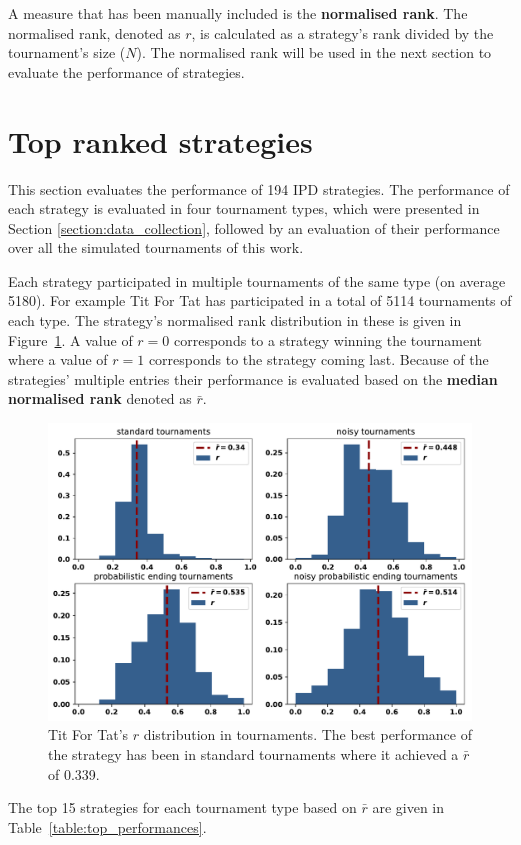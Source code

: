 \documentclass{article}
\newcommand{\numberofalltournaments}{}
\begin{document}
A measure that has been manually included
is the \textbf{normalised rank}. The normalised rank, denoted as $r$, is
calculated as a strategy's rank divided by the tournament's size ($N$). The
normalised rank will be used in the next section to evaluate the performance of
strategies.

\section{Top ranked strategies}\label{section:top_performances}

This section evaluates the performance of 194 IPD strategies. The performance of
each strategy is evaluated in four tournament types, which were presented in Section
\ref{section:data_collection}, followed by an evaluation of their performance
over all the \numberofalltournaments simulated tournaments of this work.

Each strategy participated in multiple tournaments of the same type (on average 5180).
For example Tit For Tat has participated in a total of 5114
tournaments of each type. The strategy's normalised rank distribution in these
is given in Figure~\ref{fig:tit_for_tat_r_distribution}. A value of \(r =
0\) corresponds to a strategy winning the tournament where a value of
\(r = 1\) corresponds to the strategy coming last. Because of the strategies'
multiple entries their performance is evaluated based on the
\textbf{median normalised rank} denoted as \(\bar{r}\).

\begin{figure}[!htbp]
    \centering
    \includegraphics[width=.45\textwidth]{../images/tit_for_tat_r_distributions.pdf}
    \caption{Tit For Tat's $r$ distribution in tournaments. The best performance
    of the strategy has been in standard tournaments where it achieved a $\bar{r}$
    of 0.339.}
    \label{fig:tit_for_tat_r_distribution}
\end{figure}

The top 15 strategies for each tournament type based on \(\bar{r}\) are given in
Table~\ref{table:top_performances}.
\end{document}
